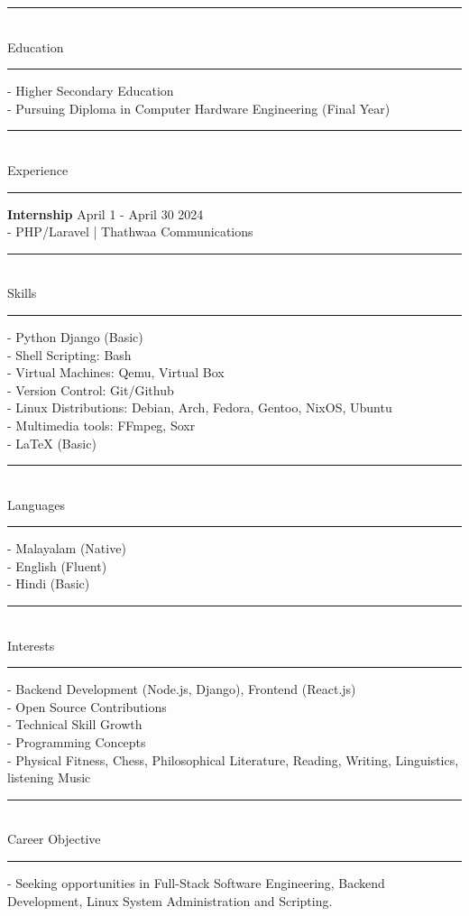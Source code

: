 \documentclass[a4paper,11pt]{article}
\newcommand{\linedtext}[1]{
    \noindent\rule{\textwidth}{0.3mm}\\[0.1em]
    \textcolor[RGB]{110,110,110}{\Large #1} \\[-0.7em]
    \noindent\rule{\textwidth}{0.3mm}
}
\begin{document}
\vspace{-11cm}
\hspace{5cm}
\begin{minipage}[t]{0.7\textwidth}
    \linedtext{Education}
    - Higher Secondary Education \\
    - Pursuing Diploma in Computer Hardware Engineering (Final Year)
    \vspace{0.3cm}

    \linedtext{Experience}
    \textbf{Internship} \hspace{6cm} April 1 - April 30 2024 \\
    - PHP/Laravel | Thathwaa Communications
    \vspace{0.3cm}

    \linedtext{Skills}
    - Python Django (Basic) \\
    - Shell Scripting: Bash \\
    - Virtual Machines: Qemu, Virtual Box \\
    - Version Control: Git/Github \\
    - Linux Distributions: Debian, Arch, Fedora, Gentoo, NixOS, Ubuntu \\
    - Multimedia tools: FFmpeg, Soxr \\
    - LaTeX (Basic)
    \vspace{0.3cm}

    \linedtext{Languages}
    - Malayalam (Native) \\
    - English (Fluent) \\
    - Hindi (Basic)
    \vspace{0.3cm}

    \linedtext{Interests}
    - Backend Development (Node.js, Django), Frontend (React.js) \\
    - Open Source Contributions \\
    - Technical Skill Growth \\
    - Programming Concepts \\
    - Physical Fitness, Chess, Philosophical Literature, Reading, Writing, Linguistics, listening Music
    \vspace{0.3cm}

    \linedtext{Career Objective}
    - Seeking opportunities in Full-Stack Software Engineering, Backend Development, Linux System Administration and Scripting.
\end{minipage}
\end{document}
